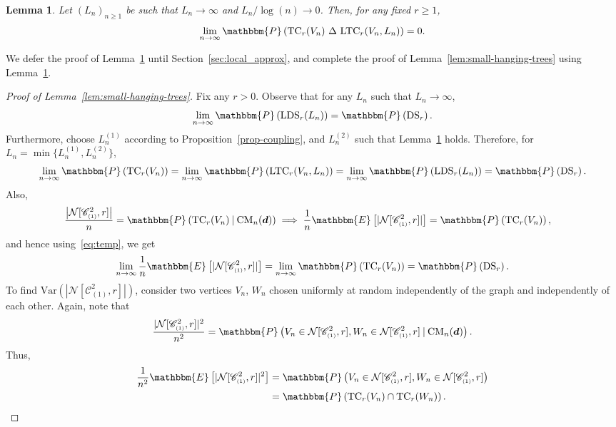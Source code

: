 \documentclass[11pt,a4paper, reqno]{article}
\newcommand\given[1][]{\:#1\vert\:}
\numberwithin{equation}{section}
\numberwithin{equation}{section}
\def\sss{\scriptscriptstyle}
\newcommand{\prob}[1]{\ensuremath{\mathbbm{P}\left(#1\right)}}
\newcommand{\expt}[1]{\ensuremath{\mathbbm{E}\left[#1\right]}}
\newcommand{\var}[1]{\ensuremath{\mathrm{Var}\left(#1\right)}}
\newcommand{\1}{\ensuremath{\mathbbm{1}}}
\newcommand{\CM}{\ensuremath{\mathrm{CM}_n(\boldsymbol{d})}}
\newcommand{\C}{\mathscr{C}_{\sss (1)}}
\newcommand{\TC}{\mathrm{TC}}
\newcommand{\LTC}{\mathrm{LTC}}
\newcommand{\DS}{\mathrm{DS}}
\newcommand{\LDS}{\mathrm{LDS}}
\newtheorem{lemma}[theorem]{Lemma}
\numberwithin{equation}{section}
\numberwithin{theorem}{section}
\begin{document}
\begin{lemma}\label{lem:loc-event-approx} 
Let $(L_n)_{n\geq 1}$ be such that $L_n\to\infty$ and $L_n/\log(n)\to 0$.
Then, for any fixed $r\geq 1$, 
$$\lim_{n\to\infty}\prob{\mathrm{TC}_r(V_n)\ \Delta\ \mathrm{LTC}_r(V_n,L_n)}= 0.$$
\end{lemma}
We defer the proof of Lemma~\ref{lem:loc-event-approx} until Section~\ref{sec:local_approx}, and complete the proof of  Lemma~\ref{lem:small-hanging-trees} using Lemma~\ref{lem:loc-event-approx}.
\begin{proof}[Proof of Lemma~\ref{lem:small-hanging-trees}]
Fix any $r>0$. 
Observe that for any $L_n$ such that $L_n\to\infty$,
\begin{equation*}
\lim_{n\to\infty}\prob{\LDS_r(L_n)}=\prob{\DS_r}.
\end{equation*}
Furthermore, choose $L_n^{(1)}$ according to Proposition~\ref{prop-coupling}, and $L_n^{(2)}$ such that Lemma~\ref{lem:loc-event-approx} holds.
Therefore, for $L_n = \min\{L_n^{(1)},L_n^{(2)}\}$, 
\begin{align}\label{eq:temp}
\lim_{n\to\infty} \prob{\TC_r(V_n)}
=\lim_{n\to\infty} \prob{\LTC_r(V_n,L_n)} 
=\lim_{n\to\infty} \prob{\LDS_r(L_n)}
=\prob{\DS_r}.
\end{align}
Also, 
\begin{align*}
&\frac{\left|\mathcal{N}[\mathscr{C}_{\sss (1)}^2,r]\right|}{n} = \prob{\TC_r(V_n)\given \CM}
\implies \frac{1}{n}\expt{|\mathcal{N}[\mathscr{C}_{\sss (1)}^2,r]|} = \prob{\TC_r(V_n)},
\end{align*}
and hence using~\eqref{eq:temp}, we get
\begin{equation}\label{eq:mean-conv}
\lim_{n\to\infty}\frac{1}{n}\expt{|\mathcal{N}[\mathscr{C}_{\sss (1)}^2,r]|} = \lim_{n\to\infty}\prob{\TC_r(V_n)}=\prob{\DS_r}.
\end{equation}
To find $\var{|\mathcal{N}[\C^2,r]|}$, consider two vertices $V_n$, $W_n$ chosen uniformly at random independently of the graph and independently of each other. 
Again, note that
$$\frac{|\mathcal{N}[\C^2,r]|^2}{n^2} = \prob{V_n\in\mathcal{N}[\C^2,r], W_n\in\mathcal{N}[\C^2,r]\given \CM}.$$
Thus,
\begin{equation}\label{var-negihbor-2core-d}
 \begin{split}
  \frac{1}{n^2}\expt{|\mathcal{N}[\C^2,r]|^2} &=  \prob{V_n\in\mathcal{N}[\C^2,r], W_n\in\mathcal{N}[\C^2,r]} \\
  &= \prob{\TC_r(V_n)\cap \TC_r(W_n)}. 
  \end{split}
\end{equation}

\end{proof}
\end{document}
